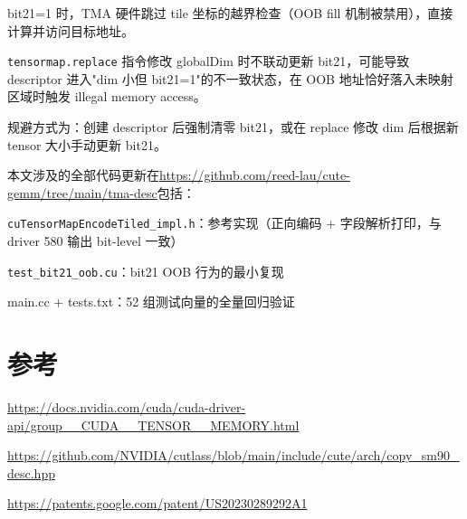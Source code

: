 bit21=1 时，TMA 硬件跳过 tile 坐标的越界检查（OOB fill 机制被禁用），直接计算并访问目标地址。

\lstinline|tensormap.replace| 指令修改 globalDim 时不联动更新 bit21，可能导致 descriptor 进入"dim 小但 bit21=1"的不一致状态，在 OOB 地址恰好落入未映射区域时触发 illegal memory access。

规避方式为：创建 descriptor 后强制清零 bit21，或在 replace 修改 dim 后根据新 tensor 大小手动更新 bit21。

本文涉及的全部代码更新在\url{https://github.com/reed-lau/cute-gemm/tree/main/tma-desc}包括：

\lstinline|cuTensorMapEncodeTiled_impl.h|：参考实现（正向编码 + 字段解析打印，与 driver 580 输出 bit-level 一致）

\lstinline|test_bit21_oob.cu|：bit21 OOB 行为的最小复现

main.cc + tests.txt：52 组测试向量的全量回归验证

\section{参考}

\url{https://docs.nvidia.com/cuda/cuda-driver-api/group__CUDA__TENSOR__MEMORY.html}

\url{https://github.com/NVIDIA/cutlass/blob/main/include/cute/arch/copy_sm90_desc.hpp}

\url{https://patents.google.com/patent/US20230289292A1}
